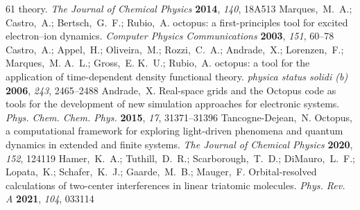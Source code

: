 \documentclass[journal=jacsat,manuscript=article]{achemso}
\begin{document}
\begin{mcitethebibliography}{61}
  theory. \emph{The Journal of Chemical Physics} \textbf{2014}, \emph{140},
  18A513\relax
\mciteBstWouldAddEndPuncttrue
\mciteSetBstMidEndSepPunct{\mcitedefaultmidpunct}
{\mcitedefaultendpunct}{\mcitedefaultseppunct}\relax
\EndOfBibitem
{}
Marques,~M.~A.; Castro,~A.; Bertsch,~G.~F.; Rubio,~A. octopus: a
  first-principles tool for excited electron–ion dynamics. \emph{Computer
  Physics Communications} \textbf{2003}, \emph{151}, 60--78\relax
\mciteBstWouldAddEndPuncttrue
\mciteSetBstMidEndSepPunct{\mcitedefaultmidpunct}
{\mcitedefaultendpunct}{\mcitedefaultseppunct}\relax
\EndOfBibitem
{}
Castro,~A.; Appel,~H.; Oliveira,~M.; Rozzi,~C.~A.; Andrade,~X.; Lorenzen,~F.;
  Marques,~M. A.~L.; Gross,~E. K.~U.; Rubio,~A. octopus: a tool for the
  application of time-dependent density functional theory. \emph{physica status
  solidi (b)} \textbf{2006}, \emph{243}, 2465--2488\relax
\mciteBstWouldAddEndPuncttrue
\mciteSetBstMidEndSepPunct{\mcitedefaultmidpunct}
{\mcitedefaultendpunct}{\mcitedefaultseppunct}\relax
\EndOfBibitem
{}
Andrade,~X.   Real-space grids and the Octopus code as tools for
  the development of new simulation approaches for electronic systems.
  \emph{Phys. Chem. Chem. Phys.} \textbf{2015}, \emph{17}, 31371--31396\relax
\mciteBstWouldAddEndPuncttrue
\mciteSetBstMidEndSepPunct{\mcitedefaultmidpunct}
{\mcitedefaultendpunct}{\mcitedefaultseppunct}\relax
\EndOfBibitem
{}
Tancogne-Dejean,~N.   Octopus, a computational framework for
  exploring light-driven phenomena and quantum dynamics in extended and finite
  systems. \emph{The Journal of Chemical Physics} \textbf{2020}, \emph{152},
  124119\relax
\mciteBstWouldAddEndPuncttrue
\mciteSetBstMidEndSepPunct{\mcitedefaultmidpunct}
{\mcitedefaultendpunct}{\mcitedefaultseppunct}\relax
\EndOfBibitem
{}
Hamer,~K.~A.; Tuthill,~D.~R.; Scarborough,~T.~D.; DiMauro,~L.~F.; Lopata,~K.;
  Schafer,~K.~J.; Gaarde,~M.~B.; Mauger,~F. Orbital-resolved calculations of
  two-center interferences in linear triatomic molecules. \emph{Phys. Rev. A}
  \textbf{2021}, \emph{104}, 033114\relax
\mciteBstWouldAddEndPuncttrue
\mciteSetBstMidEndSepPunct{\mcitedefaultmidpunct}
{\mcitedefaultendpunct}{\mcitedefaultseppunct}\relax
\EndOfBibitem
\end{mcitethebibliography}
\end{document}
